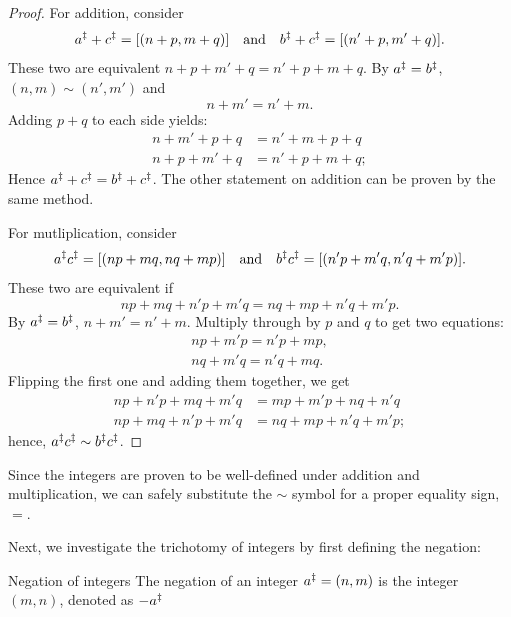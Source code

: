 \begin{proof}
  For addition, consider
  \begin{equation}
    a^{\ddagger} + c^{\ddagger} = [(n + p, m + q)] \quad\textrm{and}\quad b^{\ddagger} + c^{\ddagger} = [(n' + p, m' + q)].
  \end{equation}
  These two are equivalent \ifft \(n + p + m' + q = n' + p + m + q\). By \(a^{\ddagger} = b^{\ddagger}\),
  \((n, m) \sim (n', m')\) and
  \begin{equation}
    n + m' = n' + m.
  \end{equation}
  Adding \(p + q\) to each side yields:
  \begin{align}
    n + m' + p + q & = n' + m + p + q  \\
    n + p + m' + q & = n' + p + m + q;
  \end{align}
  Hence \(a^{\ddagger} + c^{\ddagger} = b^{\ddagger} + c^{\ddagger}\). The other statement on addition can be
  proven by the same method.

  For mutliplication, consider
  \begin{equation}
    a^{\ddagger}c^{\ddagger} = [(np + mq, nq + mp)] \quad\textrm{and}\quad b^{\ddagger}c^{\ddagger} = [(n'p + m'q, n'q + m'p)].
  \end{equation}
  These two are equivalent if
  \begin{equation}
    np + mq + n'p + m'q = nq + mp + n'q + m'p.
  \end{equation}
  By \(a^{\ddagger} = b^{\ddagger}\), \(n + m' = n' + m\). Multiply through by \(p\) and \(q\)
  to get two equations:
  \begin{gather}
    np + m'p = n'p + mp, \\
    nq + m'q = n'q + mq.
  \end{gather}
  Flipping the first one and adding them together, we get
  \begin{align}
    np + n'p + mq + m'q & = mp + m'p + nq + n'q  \\
    np + mq + n'p + m'q & = nq + mp + n'q + m'p;
  \end{align}
  hence, \(a^{\ddagger}c^{\ddagger} \sim b^{\ddagger}c^{\ddagger}\).
\end{proof}

Since the integers are proven to be well-defined under addition and multiplication, we can safely
substitute the \(\sim\) symbol for a proper equality sign, \(=\).

Next, we investigate the trichotomy of integers by first defining the negation:

\begin{df}{Negation of integers}{}
  The negation of an integer \(a^{\ddagger} = (n, m)\) is the integer \((m, n)\), denoted as
  \(-a^{\ddagger}\)
\end{df}

